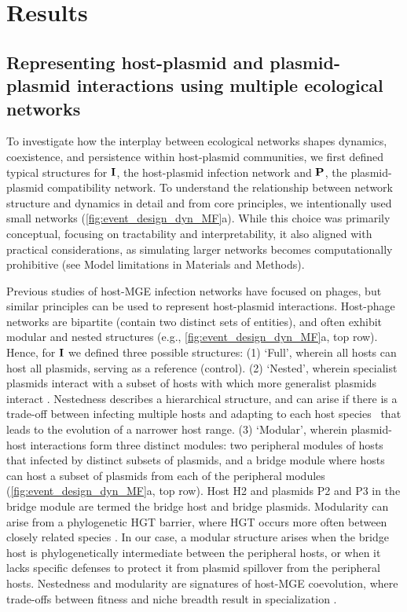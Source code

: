 \documentclass[10pt,letterpaper]{article}
\begin{document}
\section*{Results}
\subsection*{Representing host-plasmid and plasmid-plasmid interactions using multiple ecological networks}
To investigate how the interplay between ecological networks shapes dynamics, coexistence, and persistence within host-plasmid communities, we first defined typical structures for $\vb{I}$, the host-plasmid infection network and $\vb{P}$, the plasmid-plasmid compatibility network. To understand the relationship between network structure and dynamics in detail and from core principles, we intentionally used small networks (\cref{fig:event_design_dyn_MF}a). While this choice was primarily conceptual, focusing on tractability and interpretability, it also aligned with practical considerations, as simulating larger networks becomes computationally prohibitive (see Model limitations in Materials and Methods).

Previous studies of host-MGE infection networks have focused on phages, but similar principles can be used to represent host-plasmid interactions. Host-phage networks are bipartite (contain two distinct sets of entities), and often exhibit modular and nested structures \cite{Flores2011-fx, Weitz2013-ye, Pilosof2020-lz} (e.g., \cref{fig:event_design_dyn_MF}a, top row). Hence, for $\vb{I}$ we defined three possible structures: (1) `Full', wherein all hosts can host all plasmids, serving as a reference (control). (2) `Nested', wherein specialist plasmids interact with a subset of hosts with which more generalist plasmids interact \cite{Flores2011-fx, Weitz2013-ye, Beckett2013-tz, Fortuna2019-tr}. Nestedness describes a hierarchical structure, and can arise if there is a trade-off between infecting multiple hosts and adapting to each host species~\cite{Weitz2013-ye, Fortuna2019-tr, Pilosof2020-lz} that leads to the evolution of a narrower host range. (3) `Modular', wherein plasmid-host interactions form three distinct modules: two peripheral modules of hosts that infected by distinct subsets of plasmids, and a bridge module where hosts can host a subset of plasmids from each of the peripheral modules (\cref{fig:event_design_dyn_MF}a, top row). Host H2 and plasmids P2 and P3 in the bridge module are termed the bridge host and bridge plasmids. Modularity can arise from a phylogenetic HGT barrier, where HGT occurs more often between closely related species \cite{Popa2011-lo, Popa2017-zd}. In our case, a modular structure arises when the bridge host is phylogenetically intermediate between the peripheral hosts, or when it lacks specific defenses to protect it from plasmid spillover from the peripheral hosts. Nestedness and modularity are signatures of host-MGE coevolution, where trade-offs between fitness and niche breadth result in specialization \cite{Weitz2013-ye, Fortuna2019-tr, Pilosof2020-lz}.
\end{document}
